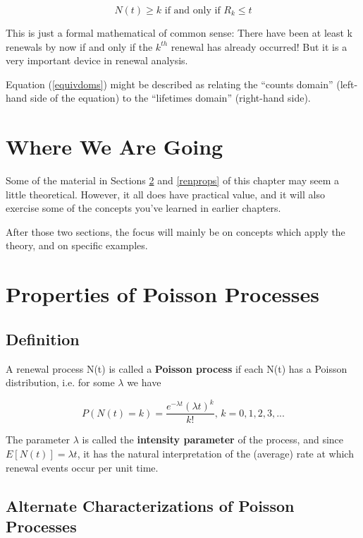 \begin{equation}
\label{equivdoms}
N(t) \geq k  \textrm{ if and only if } R_k \leq t
\end{equation}

This is just a formal mathematical of common sense:  There have been at
least k renewals by now if and only if the $k^{th}$ renewal has already
occurred!  But it is a very important device in renewal analysis.

Equation (\ref{equivdoms}) might be described as relating the ``counts
domain'' (left-hand side of the equation) to the ``lifetimes domain''
(right-hand side).

\section{Where We Are Going}

Some of the material in Sections \ref{pois} and \ref{renprops} of this 
chapter may seem a little theoretical.  However, it all does have practical
value, and it will also exercise some of the concepts you've learned in
earlier chapters.  

After those two sections, the focus will mainly be on concepts which
apply the theory, and on specific examples.

\section{Properties of Poisson Processes}
\label{pois}

\subsection{Definition}

A renewal process N(t) is called a \textbf{Poisson process} if each N(t)
has a Poisson distribution, i.e. for some $\lambda $ we have

\begin{equation}
P(N(t)=k)=\frac{e^{-\lambda t}(\lambda t)^{k}}{k!},\, k=0,1,2,3,...
\end{equation}

The parameter $\lambda $ is called the \textbf{intensity parameter}
of the process, and since $E[N(t)]=\lambda t$, it has the natural
interpretation of the (average) rate at which renewal events occur per
unit time.

\subsection{Alternate Characterizations of Poisson Processes}

